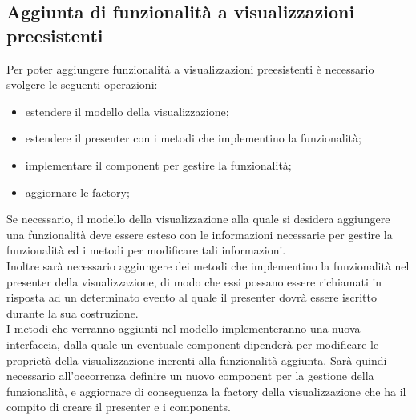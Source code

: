 \documentclass[../manuale_sviluppatore.tex]{subfiles}
\begin{document}
\subsection{Aggiunta di funzionalità a visualizzazioni preesistenti}
\label{sub:funzionalita}

Per poter aggiungere funzionalità a visualizzazioni preesistenti è necessario svolgere le seguenti 
operazioni:
\begin{itemize}
	\item estendere il modello della visualizzazione;
	\item estendere il presenter con i metodi che implementino la funzionalità;
	\item implementare il component per gestire la funzionalità;
	\item aggiornare le factory;
\end{itemize}

Se necessario, il modello della visualizzazione alla quale si desidera aggiungere una 
funzionalità deve essere esteso con le informazioni necessarie per gestire la funzionalità ed i 
metodi per modificare tali informazioni.\\

Inoltre sarà necessario aggiungere dei metodi che implementino la funzionalità nel presenter della 
visualizzazione, di modo che essi possano essere richiamati in risposta ad un determinato evento al 
quale il presenter dovrà essere iscritto durante la sua costruzione.\\

I metodi che verranno aggiunti nel modello implementeranno una nuova interfaccia, dalla quale un 
eventuale component dipenderà per modificare le proprietà della visualizzazione inerenti alla 
funzionalità aggiunta. Sarà quindi necessario all'occorrenza definire un nuovo component per la 
gestione della funzionalità, e aggiornare di conseguenza la factory della visualizzazione che ha il 
compito di creare il presenter e i components.
\end{document}
